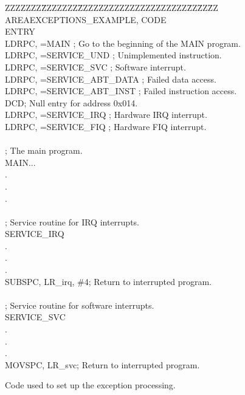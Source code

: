 \documentclass[11pt, twoside, pdftex]{article}
\begin{document}
\begin{figure}[H]
\begin{center} %
\parbox{12.5cm}{
\begin{tabbing}
ZZZZZZZ\=ZZZZZZZ\=ZZZZZZZZZZZZZZZZZZZZZ\=ZZ\=ZZ\=ZZ\kill
\>AREA\>EXCEPTIONS\_EXAMPLE, CODE \\
\>ENTRY \\
\>LDR\>PC, =MAIN \>; Go to the beginning of the MAIN program. \\
\>LDR\>PC, =SERVICE\_UND \>; Unimplemented instruction. \\
\>LDR\>PC, =SERVICE\_SVC \>; Software interrupt. \\
\>LDR\>PC, =SERVICE\_ABT\_DATA \>; Failed data access. \\
\>LDR\>PC, =SERVICE\_ABT\_INST \>; Failed instruction access. \\
\>DCD\>; Null entry for address 0x014. \\
\>LDR\>PC, =SERVICE\_IRQ \>; Hardware IRQ interrupt. \\
\>LDR\>PC, =SERVICE\_FIQ \>; Hardware FIQ interrupt. \\
~\\
; The main program. \\
MAIN\>... \\
\>. \\
\>. \\
\>. \\
~\\
; Service routine for IRQ interrupts. \\
SERVICE\_IRQ \\
\>. \\
\>. \\
\>. \\
\>SUBS\>PC, LR\_irq, \#4\>; Return to interrupted program. \\
~\\
; Service routine for software interrupts. \\
SERVICE\_SVC \\
\>. \\
\>. \\
\>. \\
\>MOVS\>PC, LR\_svc\>; Return to interrupted program. \\

\end{tabbing} } %
\end{center}
	\vspace{-0.33in}
	\caption{Code used to set up the exception processing.}
	\label{fig:5}
\end{figure}
\end{document}
